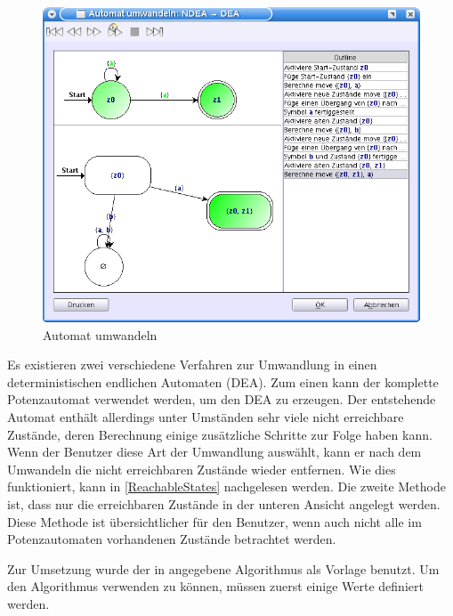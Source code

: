\begin{figure}[h!]
\begin{center}
\includegraphics[width=12cm]{../images/convert_to.png}
\caption{Automat umwandeln}
\end{center}
\end{figure}
\vspace{10pt}

Es existieren zwei verschiedene Verfahren zur Umwandlung in einen
deterministischen endlichen Automaten (DEA). Zum einen kann der komplette
Potenzautomat verwendet werden, um den DEA zu erzeugen. Der entstehende Automat
enthält allerdings unter Umständen sehr viele nicht erreichbare Zustände, deren
Berechnung einige zusätzliche Schritte zur Folge haben kann. Wenn der Benutzer
diese Art der Umwandlung auswählt, kann er nach dem Umwandeln die nicht
erreichbaren Zustände wieder entfernen. Wie dies funktioniert, kann in
\ref{ReachableStates} nachgelesen werden. Die zweite Methode ist, dass nur die
erreichbaren Zustände in der unteren Ansicht angelegt werden. Diese Methode ist
übersichtlicher für den Benutzer, wenn auch nicht alle im Potenzautomaten
vorhandenen Zustände betrachtet werden.\vspace{10pt}

\newpage
Zur Umsetzung wurde der in \cite[S. 153ff]{Compilers} angegebene Algorithmus als
Vorlage benutzt. Um den Algorithmus verwenden zu können, müssen zuerst einige
Werte definiert werden.\vspace{10pt}


